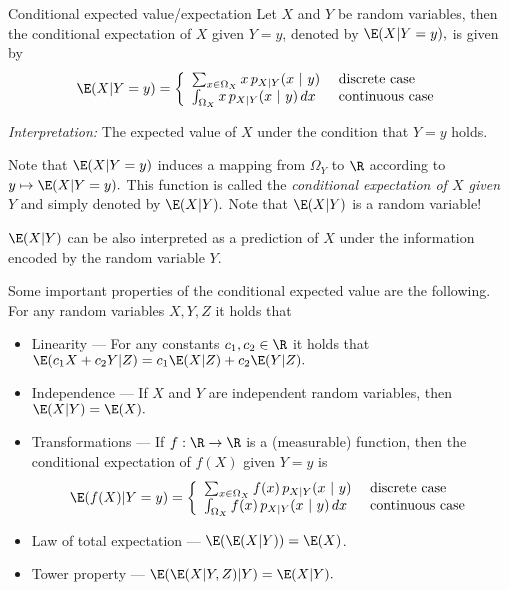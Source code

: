\documentclass[11pt,compress,t,notes=noshow, xcolor=table]{beamer}
\begin{document}
\begin{vbframe}{Conditional expected value/expectation} 
%	
	Let $X$ and $Y$ be random variables, then the conditional expectation of $X$ given $Y=y$, denoted by $\E(X|Y=y),$ is given by
	$$	\E(X|Y=y) = \left\{ \begin{array}{ll}
		\sum_{x \in \Omega_X} x \, p_{X|Y}(x ~|~ y) & \text{ discrete case} \\
		\int_{\Omega_X} x \, p_{X|Y}(x ~|~ y) \, dx& \text{ continuous case} 
	\end{array} \right.  	$$
	
	\emph{Interpretation:} The expected value of $X$ under the condition that $Y=y$ holds.
	\lz
	
	Note that $\E(X|Y=y)$ induces a mapping from $\Omega_Y$ to $\R$ according to $y \mapsto \E(X|Y=y).$
	This function is called the \emph{conditional expectation of $X$ given $Y$} and simply denoted by $\E(X|Y).$
	Note that $\E(X|Y)$ is a random variable!
	
	\lz
	
	$\E(X|Y)$ can be also interpreted as a prediction of $X$ under the information encoded by the random variable $Y.$
	
	\framebreak
	
	
	Some important properties of the conditional expected value are the following. For any random variables $X,Y,Z$ it holds that
	\begin{itemize}
		\item Linearity ---  For any constants $c_1,c_2 \in \R$  it holds that $ \E(c_1 X + c_2 Y | Z) = c_1 \E(X|Z) + c_2 \E(Y|Z).$
		\item Independence --- If $X$ and $Y$ are independent random variables, then $\E(X|Y)=\E(X).$
		\item Transformations --- If $f:\R \to \R$  is a (measurable) function, then the conditional expectation of $f(X)$ given $Y=y$ is 
		$$\E(f(X)|Y=y)  = \left\{ \begin{array}{ll}
			\sum_{x \in \Omega_X} f(x) \, p_{X|Y}(x ~|~ y) & \text{ discrete case} \\
			\int_{\Omega_X} f(x) \, p_{X|Y}(x ~|~ y) \, dx & \text{ continuous case} 
		\end{array} \right.  	$$
		\item Law of total expectation ---
		$\E(\E(X|Y)) = \E(X)$.  
		\item Tower property --- $ \E(\E(X|Y,Z)|Y) = \E(X|Y).$
	\end{itemize}
	
\end{vbframe}
\end{document}
